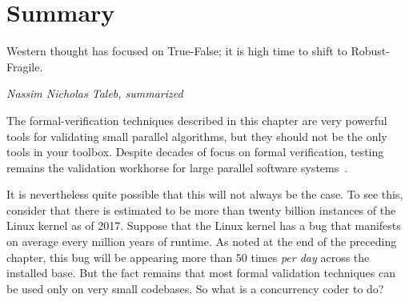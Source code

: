 \iffalse

It would be very helpful to have a tool that could somehow locate
all race conditions.
A number of such tools exist, for example,
\cref{sec:formal:State-Space Search} provides an
introduction to the general-purpose state-space search tools Promela and Spin,
\cref{sec:formal:Special-Purpose State-Space Search}
similarly introduces the special-purpose ppcmem tool,
\cref{sec:formal:Axiomatic Approaches}
looks at an example axiomatic approach,
\cref{sec:formal:SAT Solvers}
briefly overviews SAT solvers,
\cref{sec:formal:Stateless Model Checkers}
briefly overviews stateless model checkers,
\cref{sec:formal:Summary}
sums up use of formal-verification tools for verifying parallel algorithms,
and finally
\cref{sec:formal:Choosing a Validation Plan}
discusses how to decide how much and what type of validation to apply
to a given software project.

\fi








\section{Summary}
\label{sec:formal:Summary}
%
\epigraph{Western thought has focused on True-False;
	  it is high time to shift to Robust-Fragile.}
	 {\emph{Nassim Nicholas Taleb, summarized}}

The formal-verification techniques described in this chapter
are very powerful tools for validating small
parallel algorithms, but they should not be the only tools in your toolbox.
Despite decades of focus on formal verification, testing remains the
validation workhorse for large parallel software
systems~\cite{JonathanCorbet2006lockdep,DaveJones2011Trinity,PaulEMcKenney2016Formal}.

It is nevertheless quite possible that this will not always be the case.
To see this, consider that there is estimated to be more than twenty
billion instances of the Linux kernel as of 2017.
Suppose that the Linux kernel has a bug that manifests on average every million
years of runtime.
As noted at the end of the preceding chapter, this bug will be appearing
more than 50 times \emph{per day} across the installed base.
But the fact remains that most formal validation techniques can be used
only on very small codebases.
So what is a concurrency coder to do?

